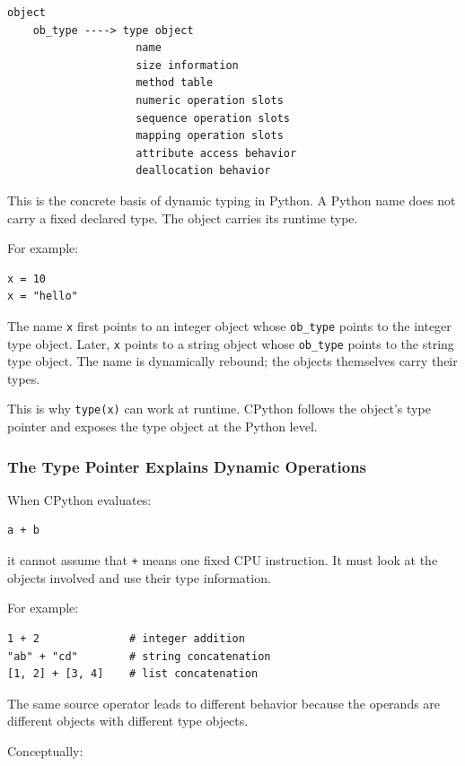 \begin{verbatim}
object
    ob_type ----> type object
                    name
                    size information
                    method table
                    numeric operation slots
                    sequence operation slots
                    mapping operation slots
                    attribute access behavior
                    deallocation behavior
\end{verbatim}

This is the concrete basis of dynamic typing in Python. A Python name does not carry a fixed declared type. The object carries its runtime type.

For example:

\begin{verbatim}
x = 10
x = "hello"
\end{verbatim}

The name \texttt{x} first points to an integer object whose \texttt{ob\_type} points to the integer type object. Later, \texttt{x} points to a string object whose \texttt{ob\_type} points to the string type object. The name is dynamically rebound; the objects themselves carry their types.

This is why \texttt{type(x)} can work at runtime. CPython follows the object's type pointer and exposes the type object at the Python level.

\subsubsection*{The Type Pointer Explains Dynamic Operations}

When CPython evaluates:

\begin{verbatim}
a + b
\end{verbatim}

it cannot assume that \texttt{+} means one fixed CPU instruction. It must look at the objects involved and use their type information.

For example:

\begin{verbatim}
1 + 2              # integer addition
"ab" + "cd"        # string concatenation
[1, 2] + [3, 4]    # list concatenation
\end{verbatim}

The same source operator leads to different behavior because the operands are different objects with different type objects.

Conceptually:

